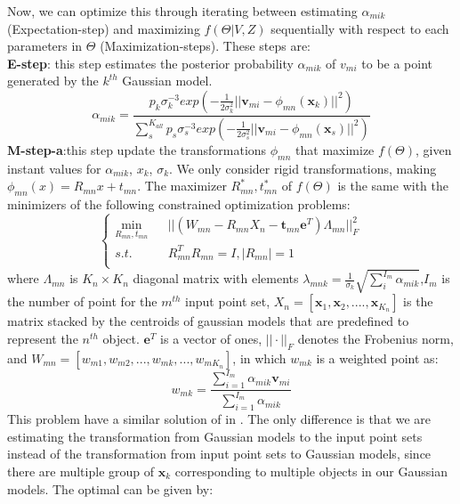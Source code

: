 Now, we can optimize this through iterating between estimating $\alpha_{mik}$ (Expectation-step) and maximizing $f(\Theta|V,Z)$ sequentially with respect to each parameters in $\Theta$ (Maximization-steps).
These steps are:\\
\textbf{E-step}:
this step estimates the posterior probability $\alpha_{mik}$ of $v_{mi}$ to be a point generated by the $k^{th}$ Gaussian model.\\
\begin{equation}
\label{equ:estep}
\alpha_{mik}=\frac{p_k\sigma_k^{-3}exp(-\frac{1}{2\sigma_k^2}||\pmb v_{mi}-\phi_{mn}(\pmb x_k)||^2)}{\sum_s^{K_{all}}p_s\sigma_s^{-3}exp(-\frac{1}{2\sigma_s^2}||\pmb v_{mi}-\phi_{mn}(\pmb x_s)||^2)}
\end{equation}
\textbf{M-step-a}:this step update the transformations $\phi_{mn}$ that maximize $f(\Theta)$, given instant values for $\alpha_{mik}$, $x_k$, $\sigma_k$. We only consider rigid transformations, making  $\phi_{mn}(x)=R_{mn}x+t_{mn}$. The maximizer $R_{mn}^*,t_{mn}^*$  of $f(\Theta)$ is the same with the minimizers of the following constrained optimization problems:\\
\begin{equation}
\left\{
\begin{array}{rcl}
\min_{R_{mn},t_{mn}}&      &||(W_{mn}-R_{mn}X_n-\pmb t_{mn}\mathbf{e}^T)\Lambda_{mn}||_F^2\\
s.t.&      &R_{mn}^TR_{mn}=I, |R_{mn}|=1\\
\end{array} \right.
\end{equation}
where $\Lambda_{mn}$ is $K_n \times K_n$ diagonal matrix with elements $\lambda_{mnk}=\frac{1}{\sigma_k}\sqrt{\sum_i^{I_{m}}\alpha_{mik}}$,$I_m$ is the number of point for the $m^{th}$ input point set, $X_n = [\pmb x_1, \pmb x_2,...., \pmb x_{K_n}]$ is the matrix stacked by the centroids of gaussian models that are predefined to represent the $n^{th}$ object. $\mathbf{e}^T$ is a vector of ones, $||\cdot||_F$ denotes the Frobenius norm, and $W_{mn}=[w_{m1},w_{m2},...,w_{mk},...,w_{mK_n}]$, in which $w_{mk}$ is a weighted point as:\\
\begin{equation}
w_{mk}=\frac{\sum_{i=1}^{I_m}\alpha_{mik} \pmb v_{mi}}{\sum_{i=1}^{I_m}\alpha_{mik}}
\end{equation}
This problem have a similar solution of in \cite{Evangelidis2014}. The only difference is that we are estimating the transformation from Gaussian models to the input point sets instead of the transformation from input point sets to Gaussian models, since there are multiple group of $\pmb x_k$ corresponding to multiple objects in our Gaussian models. The optimal can be given by:\\
